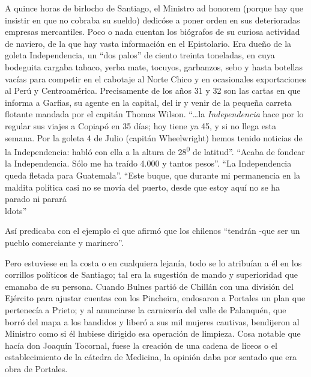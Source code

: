 \documentclass[10pt,twoside,openright]{memoir}
\begin{document}
A quince horas de birlocho de Santiago, el Ministro ad honorem (porque
hay que insistir en que no cobraba su sueldo) dedicóse a poner orden en
sus deterioradas empresas mercantiles. Poco o nada cuentan los biógrafos
de su curiosa actividad de naviero, de la que hay vasta información en
el Epistolario. Era dueño de la goleta Independencia, un ``dos palos'' de
ciento treinta toneladas, en cuya bodeguita cargaba tabaco, yerba mate,
tocuyos, garbanzos, sebo y hasta botellas vacías para competir en el
cabotaje al Norte Chico y en ocasionales exportaciones al Perú y
Centroamérica. Precisamente de los años 31 y 32 son las cartas en que
informa a Garfias, su agente en la capital, del ir y venir de la pequeña
carreta flotante mandada por el capitán Thomas Wilson. ``\ldots{}la
\emph{Independencia} hace por lo regular sus viajes a Copiapó en 35
días; hoy tiene ya 45, y si no llega esta semana. Por la goleta 4 de
Julio (capitán Wheelwright) hemos tenido noticias de la Independencia:
habló con ella a la altura de 28\textsuperscript{0} de latitud''. ``Acaba
de fondear la Independencia. Sólo me ha traído 4.000 y tantos pesos''.
``La Independencia queda fletada para Guatemala''. ``Este buque, que
durante mi permanencia en la maldita política casi no se movía del
puerto, desde que estoy aquí no se ha parado ni parará\\ldots''

Así predicaba con el ejemplo el que afirmó que los chilenos ``tendrán
-que ser un pueblo comerciante y marinero''.

Pero estuviese en la costa o en cualquiera lejanía, todo se lo atribuían
a él en los corrillos políticos de Santiago; tal era la sugestión de
mando y superioridad que emanaba de su persona. Cuando Bulnes partió de
Chillán con una división del Ejército para ajustar cuentas con los
Pincheira, endosaron a Portales un plan que pertenecía a Prieto; y al
anunciarse la carnicería del valle de Palanquén, que borró del mapa a
los bandidos y liberó a sus mil mujeres cautivas, bendijeron al Ministro
como si él hubiese dirigido esa operación de limpieza. Cosa notable que
hacía don Joaquín Tocornal, fuese la creación de una cadena de liceos o
el establecimiento de la cátedra de Medicina, la opinión daba por
sentado que era obra de Portales.
\end{document}
